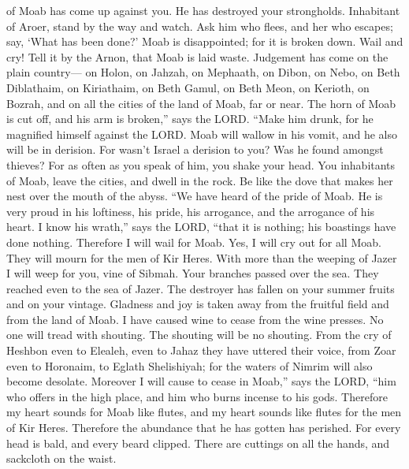 of Moab has come up against you. He has destroyed your strongholds.
 Inhabitant of Aroer, stand by the way and watch. Ask him
who flees, and her who escapes; say, `What has been done?'
 Moab is disappointed; for it is broken down. Wail and
cry! Tell it by the Arnon, that Moab is laid waste. 
Judgement has come on the plain country--- on Holon, on Jahzah, on
Mephaath,  on Dibon, on Nebo, on Beth Diblathaim,
 on Kiriathaim, on Beth Gamul, on Beth Meon,
 on Kerioth, on Bozrah, and on all the cities of the land
of Moab, far or near.  The horn of Moab is cut off, and
his arm is broken,'' says the LORD.  ``Make him drunk,
for he magnified himself against the LORD. Moab will wallow in his
vomit, and he also will be in derision.  For wasn't
Israel a derision to you? Was he found amongst thieves? For as often as
you speak of him, you shake your head.  You inhabitants
of Moab, leave the cities, and dwell in the rock. Be like the dove that
makes her nest over the mouth of the abyss.  ``We have
heard of the pride of Moab. He is very proud in his loftiness, his
pride, his arrogance, and the arrogance of his heart.  I
know his wrath,'' says the LORD, ``that it is nothing; his boastings
have done nothing.  Therefore I will wail for Moab. Yes,
I will cry out for all Moab. They will mourn for the men of Kir Heres.
 With more than the weeping of Jazer I will weep for you,
vine of Sibmah. Your branches passed over the sea. They reached even to
the sea of Jazer. The destroyer has fallen on your summer fruits and on
your vintage.  Gladness and joy is taken away from the
fruitful field and from the land of Moab. I have caused wine to cease
from the wine presses. No one will tread with shouting. The shouting
will be no shouting.  From the cry of Heshbon even to
Elealeh, even to Jahaz they have uttered their voice, from Zoar even to
Horonaim, to Eglath Shelishiyah; for the waters of Nimrim will also
become desolate.  Moreover I will cause to cease in
Moab,'' says the LORD, ``him who offers in the high place, and him who
burns incense to his gods.  Therefore my heart sounds for
Moab like flutes, and my heart sounds like flutes for the men of Kir
Heres. Therefore the abundance that he has gotten has perished.
 For every head is bald, and every beard clipped. There
are cuttings on all the hands, and sackcloth on the waist.
